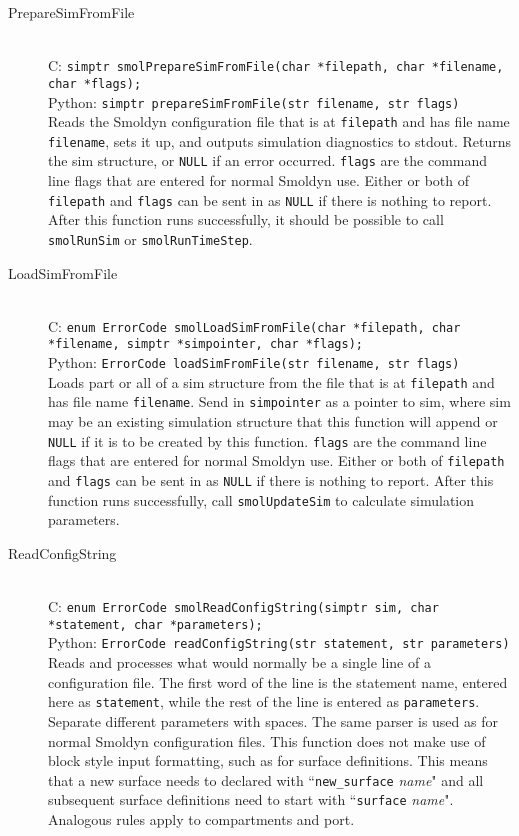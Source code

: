 \documentclass {book}
\begin{document}
\begin{description}

\item[PrepareSimFromFile]
\hfill \\
C: \texttt{simptr smolPrepareSimFromFile(char *filepath, char *filename, char *flags);}\\
Python: \texttt{simptr prepareSimFromFile(str filename, str flags)}\\
Reads the Smoldyn configuration file that is at \texttt{filepath} and has file name \texttt{filename}, sets it up, and outputs simulation diagnostics to stdout. Returns the sim structure, or \texttt{NULL} if an error occurred. \texttt{flags} are the command line flags that are entered for normal Smoldyn use. Either or both of \texttt{filepath} and \texttt{flags} can be sent in as \texttt{NULL} if there is nothing to report. After this function runs successfully, it should be possible to call \texttt{smolRunSim} or \texttt{smolRunTimeStep}.

\item[LoadSimFromFile]
\hfill \\
C: \texttt{enum ErrorCode smolLoadSimFromFile(char *filepath, char *filename, simptr *simpointer, char *flags);}\\
Python: \texttt{ErrorCode loadSimFromFile(str filename, str flags)}\\
Loads part or all of a sim structure from the file that is at \texttt{filepath} and has file name \texttt{filename}. Send in \texttt{simpointer} as a pointer to sim, where sim may be an existing simulation structure that this function will append or \texttt{NULL} if it is to be created by this function. \texttt{flags} are the command line flags that are entered for normal Smoldyn use. Either or both of \texttt{filepath} and \texttt{flags} can be sent in as \texttt{NULL} if there is nothing to report. After this function runs successfully, call \texttt{smolUpdateSim} to calculate simulation parameters.

\item[ReadConfigString]
\hfill \\
C: \texttt{enum ErrorCode smolReadConfigString(simptr sim, char *statement, char *parameters);}\\
Python: \texttt{ErrorCode readConfigString(str statement, str parameters)}\\
Reads and processes what would normally be a single line of a configuration file. The first word of the line is the statement name, entered here as \texttt{statement}, while the rest of the line is entered as \texttt{parameters}. Separate different parameters with spaces. The same parser is used as for normal Smoldyn configuration files. This function does not make use of block style input formatting, such as for surface definitions. This means that a new surface needs to declared with ``\texttt{new\_surface} \emph{name}" and all subsequent surface definitions need to start with ``\texttt{surface} \emph{name}". Analogous rules apply to compartments and port.

\end{description}
\end{document}

